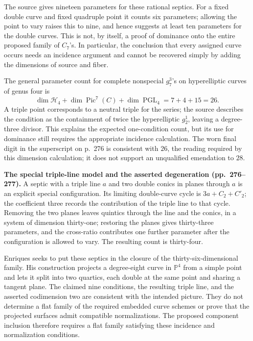 The source gives nineteen parameters for these rational septics. For a fixed double curve and fixed quadruple point it counts six parameters; allowing the point to vary raises this to nine, and hence suggests at least ten parameters for the double curves. This is not, by itself, a proof of dominance onto the entire proposed family of \(C_7\)'s. In particular, the conclusion that every assigned curve occurs needs an incidence argument and cannot be recovered simply by adding the dimensions of source and fiber.

The general parameter count for complete nonspecial \(g^3_7\)'s on hyperelliptic curves of genus four is
\[
\dim\mathcal H_4+\dim\operatorname{Pic}^7(C)+\dim\operatorname{PGL}_4
=7+4+15=26.
\]
A triple point corresponds to a neutral triple for the series; the source describes the condition as the containment of twice the hyperelliptic \(g^1_2\), leaving a degree-three divisor. This explains the expected one-condition count, but its use for dominance still requires the appropriate incidence calculation. The worn final digit in the superscript on p.~276 is consistent with \(26\), the reading required by this dimension calculation; it does not support an unqualified emendation to \(28\).

\textbf{The special triple-line model and the asserted degeneration (pp.~276--277).}
A septic with a triple line \(a\) and two double conics in planes through \(a\) is an explicit special configuration. Its limiting double-curve cycle is \(3a+C_2+C'_2\); the coefficient three records the contribution of the triple line to that cycle. Removing the two planes leaves quintics through the line and the conics, in a system of dimension thirty-one; restoring the planes gives thirty-three parameters, and the cross-ratio contributes one further parameter after the configuration is allowed to vary. The resulting count is thirty-four.

Enriques seeks to put these septics in the closure of the thirty-six-dimensional family. His construction projects a degree-eight curve in \(\mathbb P^4\) from a simple point and lets it split into two quartics, each double at the same point and sharing a tangent plane. The claimed nine conditions, the resulting triple line, and the asserted codimension two are consistent with the intended picture. They do not determine a flat family of the required embedded curve schemes or prove that the projected surfaces admit compatible normalizations. The proposed component inclusion therefore requires a flat family satisfying these incidence and normalization conditions.

